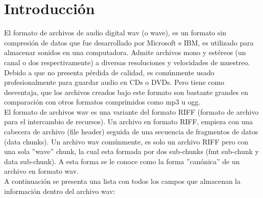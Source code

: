 \section{Introducción}
El formato de archivos de audio digital wav (o wave), es un formato sin compresión de datos que fue desarrollado por Microsoft e IBM, es utilizado para almacenar sonidos en una computadora. Admite archivos mono y estéreos (un canal o dos respectivamente) a diversas resoluciones y velocidades de muestreo.\\ Debido a que no presenta pérdida de calidad, es comúnmente usado profesionalmente para guardar audio en CDs o DVDs. Pero tiene como desventaja, que los archivos creados bajo este formato son bastante grandes en comparación con otros formatos comprimidos como mp3 u ogg.\\ El formato de archivos wav es una variante del formato RIFF (formato de archivo para el intercambio de recursos). Un archivo en formato RIFF, empieza con una cabecera de archivo (file header) seguida de una secuencia de fragmentos de datos (data chunks). Un archivo wav comúnmente, es solo un archivo RIFF pero con una sola ''wave'' chunk, la cual esta formada por dos sub-chunks (fmt sub-chunk y data sub-chunk). A esta forma se le conoce como la forma ''canónica'' de un archivo en formato wav.\\
A continuación se presenta una lista con todos los campos que almacenan la información dentro del archivo wav:
